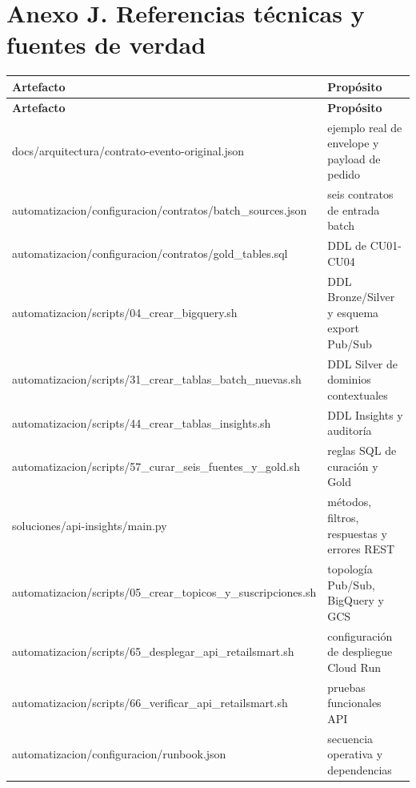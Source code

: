 \documentclass[11pt]{article}
\begin{document}
\clearpage
\section*{Anexo J. Referencias técnicas y fuentes de verdad}

\begingroup\small
\begin{longtable}{@{}>{\raggedright\arraybackslash}p{}>{\raggedright\arraybackslash}p{}@{}}
\toprule
\textbf{Artefacto} & \textbf{Propósito} \\
\midrule
\endfirsthead
\toprule
\textbf{Artefacto} & \textbf{Propósito} \\
\midrule
\endhead
docs/\allowbreak{}arquitectura/\allowbreak{}contrato-evento-original.json & ejemplo real de envelope y payload de pedido \\
automatizacion/\allowbreak{}configuracion/\allowbreak{}contratos/\allowbreak{}batch\_\allowbreak{}sources.json & seis contratos de entrada batch \\
automatizacion/\allowbreak{}configuracion/\allowbreak{}contratos/\allowbreak{}gold\_\allowbreak{}tables.sql & DDL de CU01-CU04 \\
automatizacion/\allowbreak{}scripts/\allowbreak{}04\_\allowbreak{}crear\_\allowbreak{}bigquery.sh & DDL Bronze/\allowbreak{}Silver y esquema export Pub/\allowbreak{}Sub \\
automatizacion/\allowbreak{}scripts/\allowbreak{}31\_\allowbreak{}crear\_\allowbreak{}tablas\_\allowbreak{}batch\_\allowbreak{}nuevas.sh & DDL Silver de dominios contextuales \\
automatizacion/\allowbreak{}scripts/\allowbreak{}44\_\allowbreak{}crear\_\allowbreak{}tablas\_\allowbreak{}insights.sh & DDL Insights y auditoría \\
automatizacion/\allowbreak{}scripts/\allowbreak{}57\_\allowbreak{}curar\_\allowbreak{}seis\_\allowbreak{}fuentes\_\allowbreak{}y\_\allowbreak{}gold.sh & reglas SQL de curación y Gold \\
soluciones/\allowbreak{}api-insights/\allowbreak{}main.py & métodos, filtros, respuestas y errores REST \\
automatizacion/\allowbreak{}scripts/\allowbreak{}05\_\allowbreak{}crear\_\allowbreak{}topicos\_\allowbreak{}y\_\allowbreak{}suscripciones.sh & topología Pub/\allowbreak{}Sub, BigQuery y GCS \\
automatizacion/\allowbreak{}scripts/\allowbreak{}65\_\allowbreak{}desplegar\_\allowbreak{}api\_\allowbreak{}retailsmart.sh & configuración de despliegue Cloud Run \\
automatizacion/\allowbreak{}scripts/\allowbreak{}66\_\allowbreak{}verificar\_\allowbreak{}api\_\allowbreak{}retailsmart.sh & pruebas funcionales API \\
automatizacion/\allowbreak{}configuracion/\allowbreak{}runbook.json & secuencia operativa y dependencias \\
\bottomrule
\end{longtable}
\endgroup
\end{document}
